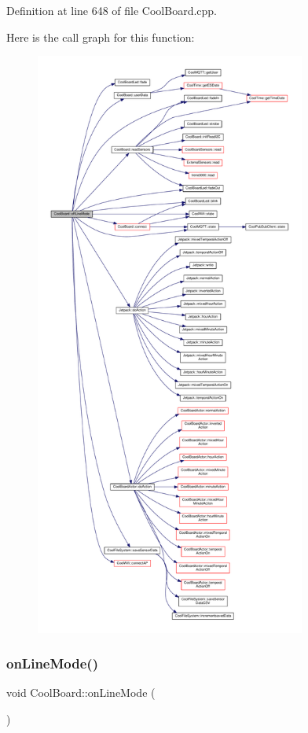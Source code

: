 Definition at line 648 of file Cool\+Board.\+cpp.

Here is the call graph for this function\+:
\nopagebreak
\begin{figure}[H]
\begin{center}
\leavevmode
\includegraphics[height=550pt]{class_cool_board_ae6b5e1274d760462290192acea4adca8_cgraph}
\end{center}
\end{figure}
\mbox{\label{class_cool_board_aa0bbc4bc605e35618d18e68795c61363}} 
\subsubsection{\texorpdfstring{on\+Line\+Mode()}{onLineMode()}}
{\footnotesize\ttfamily void Cool\+Board\+::on\+Line\+Mode (\begin{DoxyParamCaption}{ }\end{DoxyParamCaption})}

